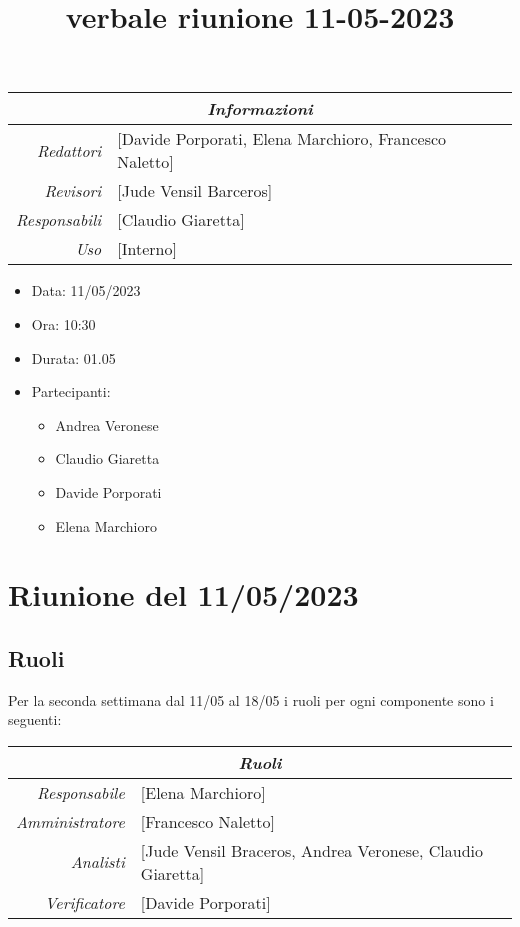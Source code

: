 \documentclass[12pt]{article}
\begin{document}
\graphicspath{ {../templates/img} }

\title{verbale riunione 11-05-2023}

\firstPage
\maketitle

\begin{center}
\begin{tabular}{r | l}
    \multicolumn{2}{c}{\textit{Informazioni}}\\
    \hline
    
        \textit{Redattori} &
        [Davide Porporati, Elena Marchioro, Francesco Naletto]\makecell{}\\
        \textit{Revisori} &
        [Jude Vensil Barceros]\makecell{}\\
        \textit{Responsabili} &
        [Claudio Giaretta]\makecell{}\\
            \textit{Uso} & 
            [Interno]\makecell{}\\
\end{tabular}
    \begin{itemize}
    \item[] Data: 11/05/2023
    \item[] Ora: 10:30
    \item[] Durata: 01.05
    \item[] Partecipanti:
    \begin{itemize}
    \item[] Andrea Veronese
    \item[] Claudio Giaretta
    \item[] Davide Porporati
    \item[] Elena Marchioro
    \end{itemize}
    \end{itemize}
\end{center}


\tableofcontents
\printindex 
\section{Riunione del 11/05/2023}
\subsection{Ruoli}
Per la seconda settimana dal 11/05 al 18/05 i ruoli per ogni componente sono i seguenti:
\\
\begin{tabular}{r | l}
    \multicolumn{2}{c}{\textit{Ruoli}}\\
    \hline
        \textit{Responsabile} &
        [Elena Marchioro]\makecell{}\\
        \textit{Amministratore} &
        [Francesco Naletto]\makecell{}\\
        \textit{Analisti} &
        [Jude Vensil Braceros, Andrea Veronese, Claudio Giaretta]\makecell{}\\
        \textit{Verificatore} & 
        [Davide Porporati]\makecell{}\\
\end{tabular}
\end{document}
